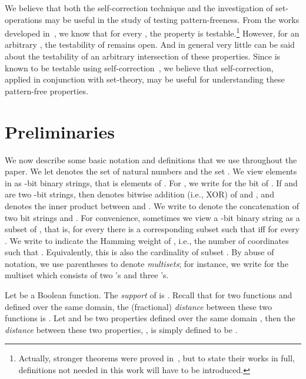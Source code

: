 \documentclass[11pt,english]{article}
\theoremstyle{definition}
\theoremstyle{remark}
\begin{document}
We believe that both the self-correction technique and the investigation of set-operations 
may be useful in the study of testing pattern-freeness. 
From the works developed in~\cite{Sha09,KSV08}, 
we know that for every , the property  is testable.\footnote{Actually, stronger theorems were proved in~\cite{Sha09,KSV08}, 
but to state their works in full, definitions not needed in this work will have to be introduced.} 
However, for an arbitrary , 
the testability of  remains open. 
And in general very little can be said about the testability 
of an arbitrary intersection of these properties.  
Since  
is known to be testable using self-correction~\cite{AKKLR03}, 
we believe that self-correction, 
applied in conjunction with set-theory, 
may be useful for understanding these pattern-free properties. 



\section{\texorpdfstring{Preliminaries}{2. Preliminaries}}

\label{Sec:prelim} We now describe some basic notation and definitions that we use throughout the paper.
We let  denotes the set of natural numbers 
and  the set . 
We view elements in  as -bit binary strings, that is elements of .
For , we write  for the  bit of .
If  and  are two -bit strings, then  denotes bitwise
addition (i.e., XOR) of  and ,
and  denotes the inner 
product between  and .
We write  to denote
the concatenation of two bit strings  and . For convenience,
sometimes we view a -bit binary string as a subset of ,
that is, for every  there is a corresponding subset 
such that  iff  for every .
We write  to indicate the Hamming weight of , i.e., the
number of coordinates  such that . Equivalently, this
is also the cardinality of subset .
By abuse of notation, we use parentheses to denote
\emph{multisets}; for instance, 
we write  for the multiset which consists of two 's
and three 's. 

Let  be a Boolean function. The \emph{support}
of  is . Recall that for two
functions  and  defined over the same domain, the (fractional) \emph{distance}
between these two functions is .
Let  and  be two properties defined over the same
domain , then the \emph{distance} between these two
properties, , is simply defined to be
.
\end{document}
